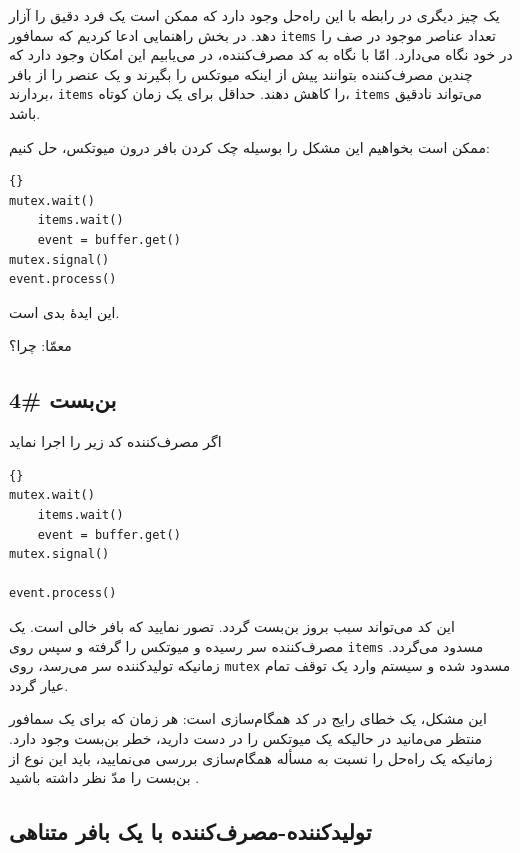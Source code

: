 \documentclass{book}
\newcommand{\clearemptydoublepage}{}%
\begin{document}
    یک چیز دیگری در رابطه با این راه‌حل وجود دارد که ممکن است یک فرد دقیق را آزار دهد. 
    در بخش راهنمایی ادعا کردیم که سمافور {\tt items} تعداد عناصر موجود در صف را در خود نگاه می‌دارد. امّا با نگاه به کد مصرف‌کننده، 
    در می‌یابیم این امکان وجود دارد که چندین مصرف‌کننده بتوانند پیش از اینکه میوتکس را بگیرند و یک عنصر را از بافر بردارند، {\tt items} را  کاهش دهند. 
    حداقل برای یک زمان کوتاه، {\tt items}  می‌تواند نادقیق باشد. 

    ممکن است بخواهیم این مشکل را بوسیله چک کردن بافر درون میوتکس، حل کنیم: 

\begin{latin}
\begin{lstlisting}[title=\rl{راه‌حل معیوب مصرف‌کننده}]{}
mutex.wait()
    items.wait()
    event = buffer.get()
mutex.signal()
event.process()
\end{lstlisting}
\end{latin}

    این ایدهٔ بدی است. 

    معمّا: چرا؟


\clearemptydoublepage
\subsection{بن‌بست \#4}


    اگر مصرف‌کننده کد زیر را اجرا نماید

\begin{latin}
\begin{lstlisting}[title=\rl{راه‌حل معیوب مصرف‌کننده}]{}
mutex.wait()
    items.wait()
    event = buffer.get()
mutex.signal()

event.process()
\end{lstlisting}
\end{latin}
%
    این کد می‌تواند سبب بروز بن‌بست گردد. تصور نمایید که بافر خالی است. یک مصرف‌کننده سر رسیده و میوتکس را گرفته و سپس روی {\tt items}
    مسدود می‌گردد. زمانیکه تولید‌کننده سر می‌رسد،‌ روی {\tt mutex} مسدود شده و سیستم وارد یک توقف تمام عیار گردد. 

    این مشکل، یک خطای رایج در کد همگام‌سازی است: هر زمان که برای یک سمافور منتظر می‌مانید در حالیکه یک میوتکس را در دست دارید، 
    خطر بن‌بست وجود دارد. زمانیکه یک راه‌حل را نسبت به مسأله همگام‌سازی بررسی می‌نمایید، باید این نوع از بن‌بست را مدّ نظر داشته باشید .


\subsection{تولیدکننده-مصرف‌کننده با یک بافر متناهی}
\end{document}
